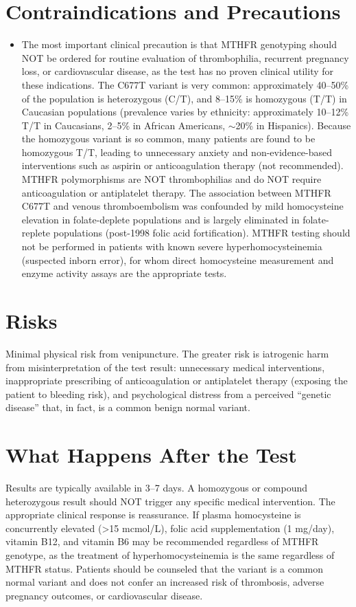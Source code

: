 \section*{Contraindications and Precautions}
\begin{itemize}
  \item The most important clinical precaution is that MTHFR genotyping should NOT be ordered for routine evaluation of thrombophilia, recurrent pregnancy loss, or cardiovascular disease, as the test has no proven clinical utility for these indications. The C677T variant is very common: approximately 40--50\% of the population is heterozygous (C/T), and 8--15\% is homozygous (T/T) in Caucasian populations (prevalence varies by ethnicity: approximately 10--12\% T/T in Caucasians, 2--5\% in African Americans, $\sim$20\% in Hispanics). Because the homozygous variant is so common, many patients are found to be homozygous T/T, leading to unnecessary anxiety and non-evidence-based interventions such as aspirin or anticoagulation therapy (not recommended). MTHFR polymorphisms are NOT thrombophilias and do NOT require anticoagulation or antiplatelet therapy. The association between MTHFR C677T and venous thromboembolism was confounded by mild homocysteine elevation in folate-deplete populations and is largely eliminated in folate-replete populations (post-1998 folic acid fortification). MTHFR testing should not be performed in patients with known severe hyperhomocysteinemia (suspected inborn error), for whom direct homocysteine measurement and enzyme activity assays are the appropriate tests.
\end{itemize}
\section*{Risks}
Minimal physical risk from venipuncture. The greater risk is iatrogenic harm from misinterpretation of the test result: unnecessary medical interventions, inappropriate prescribing of anticoagulation or antiplatelet therapy (exposing the patient to bleeding risk), and psychological distress from a perceived ``genetic disease'' that, in fact, is a common benign normal variant.

\section*{What Happens After the Test}
Results are typically available in 3--7 days. A homozygous or compound heterozygous result should NOT trigger any specific medical intervention. The appropriate clinical response is reassurance. If plasma homocysteine is concurrently elevated (>15 mcmol/L), folic acid supplementation (1 mg/day), vitamin B12, and vitamin B6 may be recommended regardless of MTHFR genotype, as the treatment of hyperhomocysteinemia is the same regardless of MTHFR status. Patients should be counseled that the variant is a common normal variant and does not confer an increased risk of thrombosis, adverse pregnancy outcomes, or cardiovascular disease.

